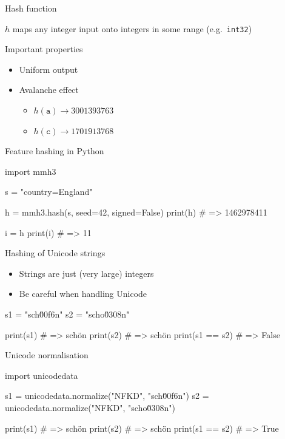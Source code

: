 \documentclass[12pt,aspectratio=169]{beamer}
\begin{document}
\begin{frame}{Hash function}
    \begin{center}
        $h$ maps \alert{any} integer input onto integers in some range
        (e.g.\ \texttt{int32})
    \end{center}
    \vfill
    \begin{block}{Important properties}
        \begin{itemize}
            \item Uniform output
            \item Avalanche effect
                  \begin{itemize}
                      \item $h \left( \texttt{a} \right) \to 3001393763$
                      \item $h \left( \texttt{c} \right) \to 1701913768$
                  \end{itemize}
        \end{itemize}
    \end{block}
\end{frame}

\begin{frame}[fragile]{Feature hashing in Python}
    \begin{py3}
        import mmh3

        s = "country=England"

        h = mmh3.hash(s, seed=42, signed=False)
        print(h)  # => 1462978411

        i = h %
        print(i)  # => 11
    \end{py3}
\end{frame}

\begin{frame}[fragile]{Hashing of Unicode strings}
    \begin{itemize}
        \item Strings are just (very large) integers
        \item Be careful when handling Unicode
    \end{itemize}
    \vfill
    \begin{py3}
        s1 = "sch\u00f6n"
        s2 = "scho\u0308n"

        print(s1)        # => schön
        print(s2)        # => schön
        print(s1 == s2)  # => False
    \end{py3}
\end{frame}

\begin{frame}[fragile]{Unicode normalisation}
    \begin{py3}
        import unicodedata

        s1 = unicodedata.normalize("NFKD", "sch\u00f6n")
        s2 = unicodedata.normalize("NFKD", "scho\u0308n")

        print(s1)        # => schön
        print(s2)        # => schön
        print(s1 == s2)  # => True
    \end{py3}
\end{frame}
\end{document}
